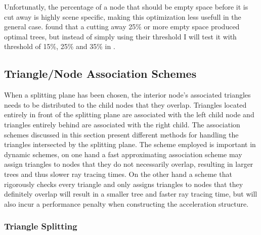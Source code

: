 Unfortunatly, the percentage of a node that should be empty space before it is
cut away is highly scene specific, making this optimization less usefull in the
general case. \zhou found that a cutting away 25\% or more empty space produced
optimal trees, but instead of simply using their threshold I will test it with
threshold of 15\%, 25\% and 35\% in .




\subsection{Triangle/Node Association Schemes}\label{sec:splittingSchemes}

When a splitting plane has been chosen, the interior node's associated triangles
needs to be distributed to the child nodes that they overlap. Triangles located
entirely in front of the splitting plane are associated with the left child node
and triangles entirely behind are associated with the right child. The
association schemes discussed in this section present different methods for
handling the triangles intersected by the splitting plane. The scheme employed
is important in dynamic schemes, on one hand a fast approximating association
scheme may assign triangles to nodes that they do not necessarily overlap,
resulting in larger trees and thus slower ray tracing times. On the other hand a
scheme that rigorously checks every triangle and only assigns triangles to nodes
that they definitely overlap will result in a smaller tree and faster ray
tracing time, but will also incur a performance penalty when constructing the
acceleration structure.





\subsubsection{Triangle Splitting}

